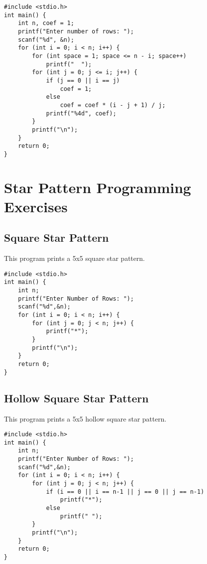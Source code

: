 \documentclass[a4paper,12pt]{article}
\begin{document}
\begin{lstlisting}[caption={Print Pascal Triangle Up to n Rows}]
#include <stdio.h>
int main() {
    int n, coef = 1;
    printf("Enter number of rows: ");
    scanf("%d", &n);
    for (int i = 0; i < n; i++) {
        for (int space = 1; space <= n - i; space++)
            printf("  ");
        for (int j = 0; j <= i; j++) {
            if (j == 0 || i == j)
                coef = 1;
            else
                coef = coef * (i - j + 1) / j;
            printf("%4d", coef);
        }
        printf("\n");
    }
    return 0;
}
\end{lstlisting}

\newpage

\section{Star Pattern Programming Exercises}

\subsection{Square Star Pattern}
This program prints a 5x5 square star pattern.
\begin{lstlisting}[caption={Square Star Pattern}]
#include <stdio.h>
int main() {
    int n;
    printf("Enter Number of Rows: ");
    scanf("%d",&n);
    for (int i = 0; i < n; i++) {
        for (int j = 0; j < n; j++) {
            printf("*");
        }
        printf("\n");
    }
    return 0;
}
\end{lstlisting}
\clearpage

\subsection{Hollow Square Star Pattern}
This program prints a 5x5 hollow square star pattern.
\begin{lstlisting}[caption={Hollow Square Star Pattern}]
#include <stdio.h>
int main() {
    int n;
    printf("Enter Number of Rows: ");
    scanf("%d",&n);
    for (int i = 0; i < n; i++) {
        for (int j = 0; j < n; j++) {
            if (i == 0 || i == n-1 || j == 0 || j == n-1)
                printf("*");
            else
                printf(" ");
        }
        printf("\n");
    }
    return 0;
}
\end{lstlisting}
\clearpage
\end{document}
